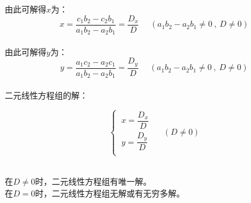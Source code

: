 \documentclass[UTF8]{ctexart}
\begin{document}
    由此可解得$x$为：
    \begin{equation}
        x=\frac{c_1b_2-c_2b_1}{a_1b_2-a_2b_1}=\frac{D_x}{D}~~~~~~(a_1b_2-a_2b_1\neq 0~,~D\neq 0)
    \end{equation}\\
    由此可解得$y$为：
    \begin{equation}
        y=\frac{a_1c_2-a_2c_1}{a_1b_2-a_2b_1}=\frac{D_y}{D}~~~~~~(a_1b_2-a_2b_1\neq 0~,~D\neq 0)
    \end{equation}\\
    二元线性方程组的解：
    \begin{large}
        \begin{equation*}
            \begin{cases}
                ~x=\dfrac{D_x}{D} \\[6mm]
                ~y=\dfrac{D_y}{D} \\
            \end{cases}~~~~~~(D\neq 0)
        \end{equation*}
    \end{large}\\[3mm]
    在$D\neq 0$时，二元线性方程组有唯一解。\\[3mm]
    在$D=0$时，二元线性方程组无解或有无穷多解。\\[3mm]

\newpage
\end{document}
